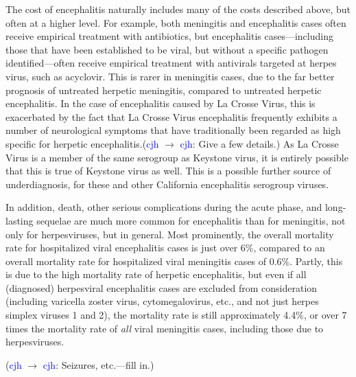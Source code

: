\documentclass[12pt]{article}
\newcommand{\cjh}{\textcolor{blue}{cjh}}
\newcommand{\msg}[3]{(#1 $\rightarrow$ #2: #3)}
\newcommand{\mcc}[1]{\msg\cjh\cjh{#1}}
\begin{document}
            The cost of encephalitis naturally includes many of the costs described above, but often at a higher level. For example, both meningitis and encephalitis cases often receive empirical treatment with antibiotics, but encephalitis cases---including those that have been established to be viral, but without a specific pathogen identified---often receive empirical treatment with antivirals targeted at herpes virus, such as acyclovir. This is rarer in meningitis cases, due to the far better prognosis of untreated herpetic meningitis, compared to untreated herpetic encephalitis. In the case of encephalitis caused by La Crosse Virus, this is exacerbated by the fact that La Crosse Virus encephalitis frequently exhibits a number of neurological symptoms that have traditionally been regarded as high specific for herpetic encephalitis.\mcc{Give a few details.} As La Crosse Virus is a member of the same serogroup as Keystone virus, it is entirely possible that this is true of Keystone virus as well. This is a possible further source of underdiagnosis, for these and other California encephalitis serogroup viruses.


            In addition, death, other serious complications during the acute phase, and long-lasting sequelae are much more common for encephalitis than for meningitis, not only for herpesviruses, but in general. Most prominently, the overall mortality rate for hospitalized viral encephalitis cases is just over 6\%\cite{george2014encephalitis}, compared to an overall mortality rate for hospitalized viral meningitis cases of 0.6\%\cite{holmquist2008meningitis}. Partly, this is due to the high mortality rate of herpetic encephalitis, but even if all (diagnosed) herpesviral encephalitis cases are excluded from consideration (including varicella zoster virus, cytomegalovirus, etc., and not just herpes simplex viruses 1 and 2), the mortality rate is still approximately 4.4\%, or over 7 times the mortality rate of \textit{all} viral meningitis cases, including those due to herpesviruses.

            \mcc{Seizures, etc.---fill in.}
            
\end{document}
